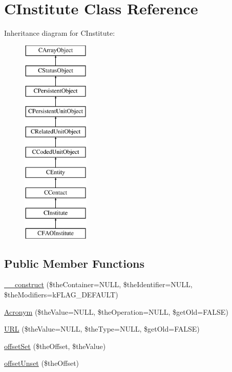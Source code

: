 \hypertarget{class_c_institute}{\section{C\-Institute Class Reference}
\label{class_c_institute}
}
Inheritance diagram for C\-Institute\-:\begin{figure}[H]
\begin{center}
\leavevmode
\includegraphics[height=10.000000cm]{class_c_institute}
\end{center}
\end{figure}
\subsection*{Public Member Functions}
\begin{DoxyCompactItemize}
\item 
\hyperlink{class_c_institute_a468ba723fabd5a67bea5016d1531b147}{\-\_\-\-\_\-construct} (\$the\-Container=N\-U\-L\-L, \$the\-Identifier=N\-U\-L\-L, \$the\-Modifiers=k\-F\-L\-A\-G\-\_\-\-D\-E\-F\-A\-U\-L\-T)
\item 
\hyperlink{class_c_institute_a0484d97ec619358927d914932eddb396}{Acronym} (\$the\-Value=N\-U\-L\-L, \$the\-Operation=N\-U\-L\-L, \$get\-Old=F\-A\-L\-S\-E)
\item 
\hyperlink{class_c_institute_af981115a3d7d208e17090f37b328979f}{U\-R\-L} (\$the\-Value=N\-U\-L\-L, \$the\-Type=N\-U\-L\-L, \$get\-Old=F\-A\-L\-S\-E)
\item 
\hyperlink{class_c_institute_a16c349e22775161c89dbf73850b24cd7}{offset\-Set} (\$the\-Offset, \$the\-Value)
\item 
\hyperlink{class_c_institute_a8f82ded3b52a6fb609c67e45669e1454}{offset\-Unset} (\$the\-Offset)
\end{DoxyCompactItemize}
